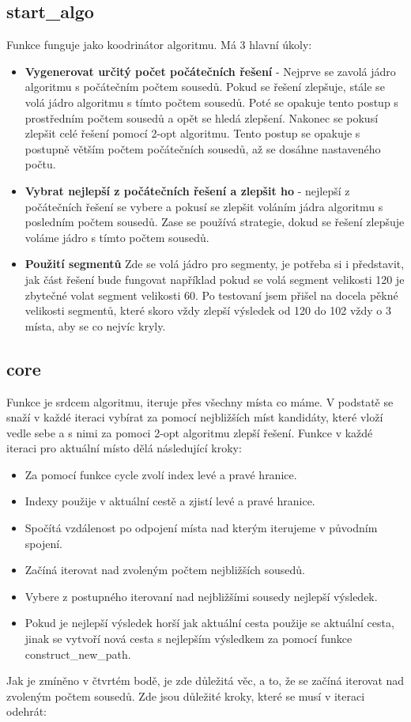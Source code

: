 \subsection{start\_algo}
Funkce funguje jako koodrinátor algoritmu. Má 3 hlavní úkoly:  
\begin{itemize}
    \item \textbf{Vygenerovat určitý počet počátečních řešení} - Nejprve se zavolá jádro algoritmu s počátečním počtem sousedů. Pokud se řešení zlepšuje, stále se volá jádro algoritmu s tímto počtem sousedů. Poté se opakuje tento postup s prostředním počtem sousedů a opět se hledá zlepšení. Nakonec se pokusí zlepšit celé řešení pomocí 2-opt algoritmu. Tento postup se opakuje s postupně větším počtem počátečních sousedů, až se dosáhne nastaveného počtu.
    \item \textbf{Vybrat nejlepší z počátečních řešení a zlepšit ho} - nejlepší z počátečních řešení se vybere a pokusí se zlepšit voláním jádra algoritmu s posledním počtem sousedů. Zase se používá strategie, dokud se řešení zlepšuje voláme jádro s tímto počtem sousedů. 
    \item \textbf{Použití segmentů} Zde se volá jádro pro segmenty, je potřeba si i představit, jak část řešení bude fungovat například pokud se volá segment velikosti 120 je zbytečné volat segment velikosti 60. Po testovaní jsem přišel na docela pěkné velikosti segmentů, které skoro vždy zlepší výsledek od 120 do 102 vždy o 3 místa, aby se co nejvíc kryly. 
\end{itemize}
\subsection{core}
Funkce je srdcem algoritmu, iteruje přes všechny místa co máme. V podstatě se snaží v každé iteraci vybírat za pomocí nejbližších míst kandidáty, které vloží vedle sebe a s nimi za pomoci 2-opt algoritmu zlepší řešení. Funkce v každé iteraci pro aktuální místo dělá následující kroky:
\begin{itemize}
    \item Za pomocí funkce cycle zvolí index levé a pravé hranice.
    \item Indexy použije v aktuální cestě a zjistí levé a pravé hranice.
    \item Spočítá vzdálenost po odpojení místa nad kterým iterujeme v původním spojení.
    \item Začíná iterovat nad zvoleným počtem nejbližších sousedů.
    \item Vybere z postupného iterovaní nad nejbližšími sousedy nejlepší výsledek.
    \item Pokud je nejlepší výsledek horší jak aktuální cesta použije se aktuální cesta, jinak se vytvoří nová cesta s nejlepším výsledkem za pomocí funkce construct\_new\_path.
\end{itemize}
Jak je zmíněno v čtvrtém bodě, je zde důležitá věc, a to, že se začíná iterovat nad zvoleným počtem sousedů. Zde jsou důležité kroky, které se musí v iteraci odehrát:

